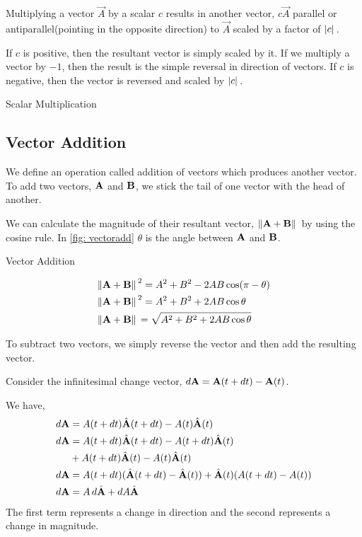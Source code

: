 Multiplying a vector \(\vec{A}\) by a scalar \(c\) results
in another vector, \(c\vec{A}\) parallel or antiparallel(pointing in the opposite 
direction) to \(\vec{A}\) scaled by a factor of \(\abs*{c}\).

If \(c\) is positive, then the resultant vector is simply scaled by it.
If we multiply a vector by \(-1\), then the result is the simple
reversal in direction of vectors. If \(c\) is negative, then the 
vector is reversed and scaled by \(\abs*{c}\). 

\begin{marginfigure}
    \centering
    \caption{Scalar Multiplication}
\end{marginfigure}

\subsection{Vector Addition}

We define an operation called addition of vectors which produces another vector.
To add two vectors, \(\boldsymbol{\mathbf{A}}\) and \(\boldsymbol{\mathbf{B}}\), we stick the tail
of one vector with the head of another. 

We can calculate the magnitude of their resultant vector, \(\norm*{\boldsymbol{\mathbf{A}} + \boldsymbol{\mathbf{B}}}\)
by using the cosine rule. In \cref{fig: vectoradd} \(\theta\) is the angle between 
\(\boldsymbol{\mathbf{A}}\) and \(\boldsymbol{\mathbf{B}}\).

\begin{marginfigure}
    \caption{Vector Addition}
    \label{fig: vectoradd}
\end{marginfigure}

\begin{align*}
    &\norm*{\boldsymbol{\mathbf{A}} + \boldsymbol{\mathbf{B}}}^2 = A^2 + B^2 - 2AB\cos(\pi - \theta) \\
    &\norm*{\boldsymbol{\mathbf{A}} + \boldsymbol{\mathbf{B}}}^2 = A^2 + B^2 + 2AB\cos\theta \\
    &\norm*{\boldsymbol{\mathbf{A}} + \boldsymbol{\mathbf{B}}} = \sqrt{A^2 + B^2 + 2AB\cos\theta}
\end{align*}
 
To subtract two vectors, we simply reverse the vector and then add the resulting vector.

\begin{example}
    Consider the infinitesimal change vector, \(\mathop{}\!{d}{\boldsymbol{\mathbf{A}}} = \boldsymbol{\mathbf{A}}(t + \mathop{}\!{d}{t}) - \boldsymbol{\mathbf{A}}(t)\).
    
    We have, 
    \begin{align*}
        \dd{\Aa} &= A(t + \dd{t})\unitv{A}(t + \dd{t}) - A(t)\unitv{A}(t) \\
        \dd{\Aa} &= A(t + \dd{t})\unitv{A}(t + \dd{t}) - A(t + \dd{t})\unitv{A}(t) \\ 
        & + A(t + \dd{t})\unitv{A}(t) - A(t)\unitv{A}(t) \\
        \dd{\Aa} &= A(t + \dd{t})(\unitv{A}(t + \dd{t}) - \unitv{A}(t)) + \unitv{A}(t)(A(t + \dd{t}) - A(t)) \\
        \dd{\Aa} &= A\dd{\unitv{A}} + \dd{A}\unitv{A} 
    \end{align*}
The first term represents a change in direction and the second represents a change in 
magnitude.
\end{example}

